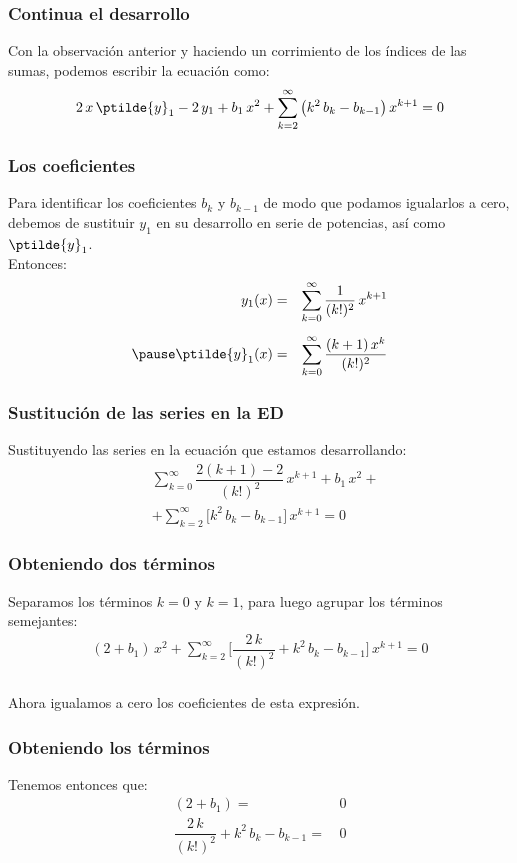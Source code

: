 \begin{frame}
\frametitle{Continua el desarrollo}
Con la observación anterior y haciendo un corrimiento de los índices de las sumas, podemos escribir la ecuación como:
\begin{align*}
2 \, x \, \ptilde{y}_{1} -  2 \, y_{1} + b_{1} \, x^{2} +  \sum_{k=2}^{\infty} \big( k^{2} \, b_{k} - b_{k-1} \big) \, x^{k+1} = 0
\end{align*}
\end{frame}
\begin{frame}
\frametitle{Los coeficientes}
Para identificar los coeficientes $b_{k}$ y $b_{k-1}$ de modo que podamos igualarlos a cero, debemos de sustituir $y_{1}$ en su desarrollo en serie de potencias, así como $\ptilde{y}_{1}$.
\\
\bigskip
\pause
Entonces:
\begin{eqnarray*}
y_{1}(x) &=& \sum_{k=0}^{\infty} \dfrac{1}{(k!)^{2}} \, x^{k+1}\\[0.5em] \pause
\ptilde{y}_{1} (x) &=& \sum_{k=0}^{\infty} \dfrac{(k+1) \, x^{k}}{(k!)^{2}}
\end{eqnarray*}
\end{frame}
\begin{frame}
\frametitle{Sustitución de las series en la ED}
Sustituyendo las series en la ecuación que estamos desarrollando:
\begin{align*}
&\sum_{k=0}^{\infty} \dfrac{2(k + 1) - 2}{(k!)^{2}} \, x^{k+1} + b_{1} \, x^{2} + \\[0.5em]
&+ \sum_{k=2}^{\infty} \bigg[ k^{2} \, b_{k} - b_{k-1} \bigg] \, x^{k+1} = 0
\end{align*}
\end{frame}
\begin{frame}
\frametitle{Obteniendo dos términos}
Separamos los términos $k = 0$ y $k = 1$, para luego agrupar los términos semejantes:
\begin{align*}
(2 + b_{1}) \, x^{2} + \sum_{k=2}^{\infty} \bigg[ \dfrac{2 \, k}{(k!)^2} + k^{2} \, b_{k} - b_{k-1} \bigg] \, x^{k+1} = 0
\end{align*}
\\
\bigskip
\pause
Ahora igualamos a cero los coeficientes de esta expresión.
\end{frame}
\begin{frame}
\frametitle{Obteniendo los términos}
Tenemos entonces que:
\begin{align*}
(2 + b_{1}) =& \, 0 \\[1em]
\dfrac{2 \, k}{(k!)^2} + k^{2} \, b_{k} - b_{k-1} =& \, 0
\end{align*}
\end{frame}
